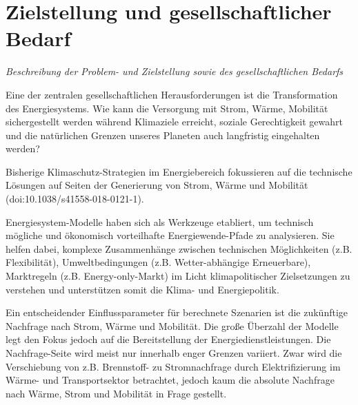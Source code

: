 \documentclass[a4paper,11pt,twoside]{scrartcl}
\begin{document}

\section{Zielstellung und gesellschaftlicher Bedarf}
\textit{Beschreibung der Problem- und Zielstellung sowie des gesellschaftlichen Bedarfs}

Eine der zentralen gesellschaftlichen Herausforderungen ist die Transformation des Energiesystems. Wie kann die Versorgung mit Strom, Wärme, Mobilität sichergestellt werden während Klimaziele erreicht, soziale Gerechtigkeit gewahrt und die natürlichen Grenzen unseres Planeten auch langfristig eingehalten werden? 

Bisherige Klimaschutz-Strategien im Energiebereich fokussieren auf die technische Lösungen auf Seiten der Generierung von Strom, Wärme und Mobilität (doi:10.1038/s41558-018-0121-1). 

Energiesystem-Modelle haben sich als Werkzeuge etabliert, um technisch mögliche und ökonomisch vorteilhafte Energiewende-Pfade zu analysieren. Sie helfen dabei, komplexe Zusammenhänge zwischen technischen Möglichkeiten (z.B. Flexibilität), Umweltbedingungen (z.B. Wetter-abhängige Erneuerbare), Marktregeln (z.B. Energy-only-Markt) im Licht klimapolitischer Zielsetzungen zu verstehen und unterstützen somit die Klima- und Energiepolitik.

Ein entscheidender Einflussparameter für berechnete Szenarien ist die zukünftige Nachfrage nach Strom, Wärme und Mobilität. Die große Überzahl der Modelle legt den Fokus jedoch auf die Bereitstellung der Energiedienstleistungen. Die Nachfrage-Seite wird meist nur innerhalb enger Grenzen variiert. Zwar wird die Verschiebung von z.B. Brennstoff- zu Stromnachfrage durch Elektrifizierung im Wärme- und Transportsektor betrachtet, jedoch kaum die absolute Nachfrage nach Wärme, Strom und Mobilität in Frage gestellt.
\end{document}
